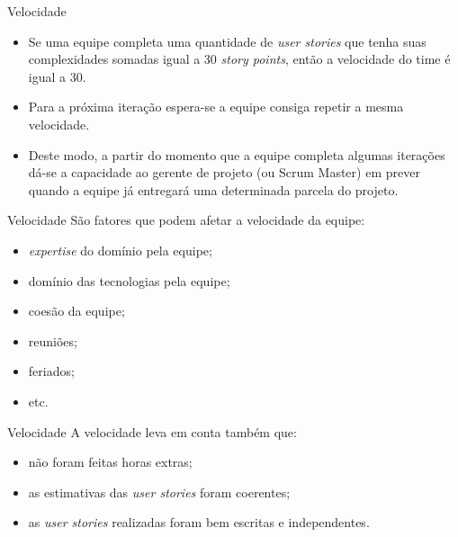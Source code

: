 \documentclass[11pt]{beamer}
\begin{document}
    \begin{frame}{Velocidade}
        \begin{itemize}
            \item Se uma equipe completa uma quantidade de \textit{user stories} que tenha suas complexidades somadas igual a 30 \textit{story points}, então a velocidade do time é igual a 30.
            \item Para a próxima iteração espera-se a equipe consiga repetir a mesma velocidade.
            \item Deste modo, a partir do momento que a equipe completa algumas iterações dá-se a capacidade ao gerente de projeto (ou Scrum Master) em prever quando a equipe já entregará uma determinada parcela do projeto.
        \end{itemize}
    \end{frame}

    \begin{frame}{Velocidade}
        São fatores que podem afetar a velocidade da equipe:
        \begin{itemize}
            \item \textit{expertise} do domínio pela equipe;
            \item domínio das tecnologias pela equipe;
            \item coesão da equipe;
            \item reuniões;
            \item feriados;
            \item etc.
        \end{itemize}
    \end{frame}

    \begin{frame}{Velocidade}
        A velocidade leva em conta também que:
        \begin{itemize}
            \item não foram feitas horas extras;
            \item as estimativas das \textit{user stories} foram coerentes;
            \item as \textit{user stories} realizadas foram bem escritas e independentes.
        \end{itemize}
    \end{frame}
\end{document}
